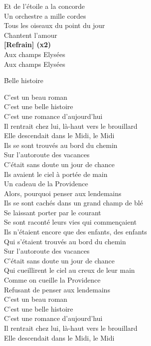 \documentclass{novel}
\begin{document}
\begin{multicols}{2}
Et de l’étoile a la concorde \\
Un orchestre a mille cordes \\
Tous les oiseaux du point du jour \\
Chantent l’amour \\

\textbf{[Refrain] (x2)}\\

Aux champs Elysées \\

Aux champs Elysées

\end{multicols}

\newpage
\normalsize
\h*{Belle histoire}
\begin{multicols}{2}
C'est un beau roman\\
C'est une belle histoire\\
C'est une romance d'aujourd'hui\\
Il rentrait chez lui, là-haut vers le brouillard\\
Elle descendait dans le Midi, le Midi\\

Ils se sont trouvés au bord du chemin\\
Sur l'autoroute des vacances\\
C'était sans doute un jour de chance\\
Ils avaient le ciel à portée de main\\
Un cadeau de la Providence\\
Alors, pourquoi penser aux lendemains\\

Ils se sont cachés dans un grand champ de blé\\
Se laissant porter par le courant\\
Se sont raconté leurs vies qui commençaient\\
Ils n'étaient encore que des enfants, des enfants\\
Qui s'étaient trouvés au bord du chemin\\
Sur l'autoroute des vacances\\
C'était sans doute un jour de chance\\
Qui cueillirent le ciel au creux de leur main\\
Comme on cueille la Providence\\
Refusant de penser aux lendemains\\

C'est un beau roman\\
C'est une belle histoire\\
C'est une romance d'aujourd'hui\\
Il rentrait chez lui, là-haut vers le brouillard\\
Elle descendait dans le Midi, le Midi\\


\end{multicols}
\end{document}
